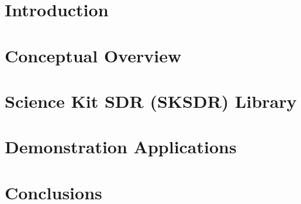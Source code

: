 \documentclass[11pt]{report}
\begin{document}
\tableofcontents
\listoffigures
\listoftables
\lstlistoflistings

\chapter{Introduction}
\label{chap:introduction}


\chapter{Conceptual Overview}
\label{chap:conceptual_overview}


\chapter{Science Kit SDR (SKSDR) Library}
\label{chap:sksdr_lib}


\chapter{Demonstration Applications}
\label{chap:demo_apps}


\chapter{Conclusions}
\label{chap:conclusions}


% 
\printbibliography[heading=bibintoc]
\end{document}
